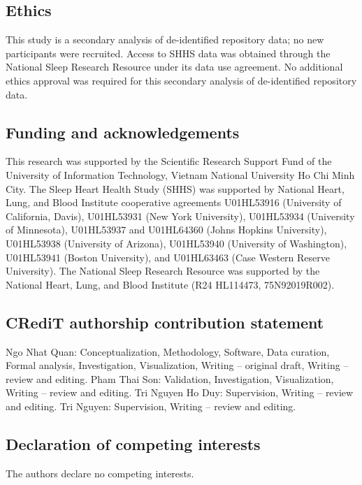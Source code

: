\documentclass[11pt,a4paper]{article}
\begin{document}
\subsection*{Ethics}

This study is a secondary analysis of de-identified repository data; no new participants were recruited.
Access to SHHS data was obtained through the National Sleep Research Resource under its data use
agreement. No additional ethics approval was required for this secondary analysis of de-identified
repository data.

\subsection*{Funding and acknowledgements}

This research was supported by the Scientific Research Support Fund of the University of Information
Technology, Vietnam National University Ho Chi Minh City. The Sleep Heart Health Study (SHHS) was
supported by National Heart, Lung, and Blood Institute cooperative agreements U01HL53916 (University
of California, Davis), U01HL53931 (New York University), U01HL53934 (University of Minnesota),
U01HL53937 and U01HL64360 (Johns Hopkins University), U01HL53938 (University of Arizona),
U01HL53940 (University of Washington), U01HL53941 (Boston University), and U01HL63463 (Case
Western Reserve University). The National Sleep Research Resource was supported by the National Heart,
Lung, and Blood Institute (R24 HL114473, 75N92019R002).

\subsection*{CRediT authorship contribution statement}

Ngo Nhat Quan: Conceptualization, Methodology, Software, Data curation, Formal analysis,
Investigation, Visualization, Writing -- original draft, Writing -- review and editing. Pham Thai Son:
Validation, Investigation, Visualization, Writing -- review and editing. Tri Nguyen Ho Duy:
Supervision, Writing -- review and editing. Tri Nguyen: Supervision, Writing -- review and editing.

\subsection*{Declaration of competing interests}

The authors declare no competing interests.
\end{document}
